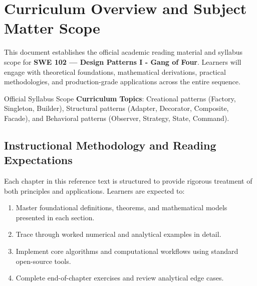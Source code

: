 \section{Curriculum Overview and Subject Matter Scope}

This document establishes the official academic reading material and syllabus scope for \textbf{SWE 102 --- Design Patterns I - Gang of Four}. Learners will engage with theoretical foundations, mathematical derivations, practical methodologies, and production-grade applications across the entire sequence.

\begin{InsightBox}{Official Syllabus Scope}
  \textbf{Curriculum Topics}: Creational patterns (Factory, Singleton, Builder), Structural patterns (Adapter, Decorator, Composite, Facade), and Behavioral patterns (Observer, Strategy, State, Command).
\end{InsightBox}

\subsection{Instructional Methodology and Reading Expectations}

Each chapter in this reference text is structured to provide rigorous treatment of both principles and applications. Learners are expected to:
\begin{enumerate}
  \item Master foundational definitions, theorems, and mathematical models presented in each section.
  \item Trace through worked numerical and analytical examples in detail.
  \item Implement core algorithms and computational workflows using standard open-source tools.
  \item Complete end-of-chapter exercises and review analytical edge cases.
\end{enumerate}

